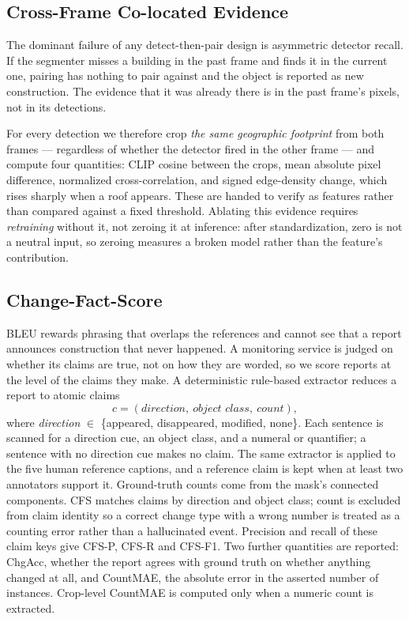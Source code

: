 \subsection{Cross-Frame Co-located Evidence}
\label{ssec:xf}

The dominant failure of any detect-then-pair design is asymmetric detector
recall. If the segmenter misses a building in the past frame and finds it in
the current one, pairing has nothing to pair against and the object is reported
as new construction. The evidence that it was already there is in the past
frame's pixels, not in its detections.

For every detection we therefore crop \emph{the same geographic footprint} from
both frames --- regardless of whether the detector fired in the other frame ---
and compute four quantities: CLIP cosine between the crops, mean absolute pixel
difference, normalized cross-correlation, and signed edge-density change, which
rises sharply when a roof appears. These are handed to $\mathrm{verify}$ as
features rather than compared against a fixed threshold. Ablating this evidence
requires \emph{retraining} without it, not zeroing it at inference: after
standardization, zero is not a neutral input, so zeroing measures a broken
model rather than the feature's contribution.

\subsection{Change-Fact-Score}
\label{ssec:cfs}

BLEU rewards phrasing that overlaps the references and cannot see that a report
announces construction that never happened. A monitoring service is judged on
whether its claims are true, not on how they are worded, so we score reports at
the level of the claims they make. A
deterministic rule-based extractor reduces a report to atomic claims
\[
  c = (\textit{direction},\ \textit{object class},\ \textit{count}),
\]
where \textit{direction} $\in$ \{appeared, disappeared, modified, none\}. Each
sentence is scanned for a direction cue, an object class, and a numeral or
quantifier; a sentence with no direction cue makes no claim. The same extractor
is applied to the five human reference captions, and a reference claim is kept
when at least two annotators support it. Ground-truth counts come from the
mask's connected components. CFS matches claims by direction and object class;
count is excluded from claim identity so a correct change type with a wrong
number is treated as a counting error rather than a hallucinated event.
Precision and recall of these claim keys give CFS-P, CFS-R and CFS-F1. Two
further quantities are reported: ChgAcc, whether the report agrees with ground
truth on whether anything changed at all, and CountMAE, the absolute error in
the asserted number of instances. Crop-level CountMAE is computed only when a
numeric count is extracted.

